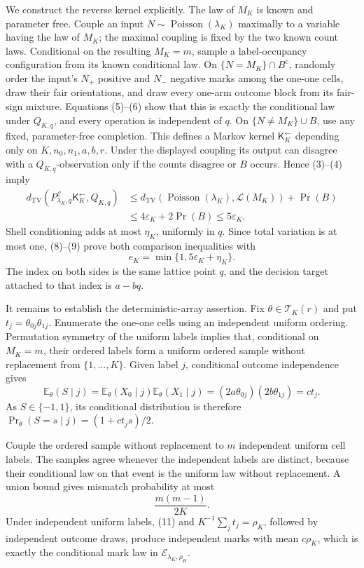 We construct the reverse kernel explicitly.  The law of \(M_K\) is
known and parameter free.  Couple an input
\(N\sim\operatorname{Poisson}(\lambda_K)\) maximally to a variable having
the law of \(M_K\); the maximal coupling is fixed by the two known count
laws.  Conditional on the resulting \(M_K=m\), sample a label-occupancy
configuration from its known conditional law.  On
\(\{N=M_K\}\cap B^{\mathrm c}\), randomly order the input's \(N_+\)
positive and \(N_-\) negative marks among the one-one cells, draw their
fair orientations, and draw every one-arm outcome block from its
fair-sign mixture.  Equations (5)--(6) show that this is exactly the
conditional law under \(Q_{K,q}\), and every operation is independent
of \(q\).  On \(\{N\ne M_K\}\cup B\), use any fixed, parameter-free
completion.  This defines a Markov kernel
\(\mathsf K_K^{\leftarrow}\) depending only on
\(K,n_0,n_1,a,b,r\).  Under the displayed coupling its output can
disagree with a \(Q_{K,q}\)-observation only if the counts disagree or
\(B\) occurs.  Hence (3)--(4) imply
\[
\begin{aligned}
 d_{\mathrm{TV}}\!\left(
 P^{\mathcal E}_{\lambda_K,q}\mathsf K_K^{\leftarrow},Q_{K,q}\right)
 &\le
 d_{\mathrm{TV}}\!\left(
 \operatorname{Poisson}(\lambda_K),\mathcal L(M_K)\right)+\Pr(B)\\
 &\le4\varepsilon_K+2\Pr(B)
 \le5\varepsilon_K.
\end{aligned}
\tag{9}
\]
Shell conditioning adds at most \(\eta_K\), uniformly in \(q\).  Since
total variation is at most one, (8)--(9) prove both comparison
inequalities with
\[
 e_K=\min\{1,5\varepsilon_K+\eta_K\}.
 \tag{10}
\]
The index on both sides is the same lattice point \(q\), and the
decision target attached to that index is \(a-bq\).

It remains to establish the deterministic-array assertion.  Fix
\(\theta\in\mathcal T_K(r)\) and put
\(t_j=\theta_{0j}\theta_{1j}\).  Enumerate the one-one cells using an
independent uniform ordering.  Permutation symmetry of the uniform
labels implies that, conditional on \(M_K=m\), their ordered labels form
a uniform ordered sample without replacement from
\(\{1,\ldots,K\}\).  Given label \(j\), conditional outcome independence
gives
\[
 \mathbb E_\theta(S\mid j)
 =
 \mathbb E_\theta(X_0\mid j)\mathbb E_\theta(X_1\mid j)
 =(2a\theta_{0j})(2b\theta_{1j})
 =ct_j.
 \tag{11}
\]
As \(S\in\{-1,1\}\), its conditional distribution is therefore
\(\Pr_\theta(S=s\mid j)=(1+ct_js)/2\).

Couple the ordered sample without replacement to \(m\) independent
uniform cell labels.  The samples agree whenever the independent labels
are distinct, because their conditional law on that event is the
uniform law without replacement.  A union bound gives mismatch
probability at most
\[
 \frac{m(m-1)}{2K}.
 \tag{12}
\]
Under independent uniform labels, (11) and
\(K^{-1}\sum_jt_j=\rho_K\), followed by independent outcome draws,
produce independent marks with mean \(c\rho_K\), which is exactly the
conditional mark law in \(\mathcal E_{\lambda_K,\rho_K}\).

